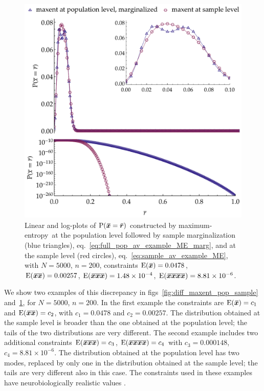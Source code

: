 \documentclass{article}
\theoremstyle{remark}
\theoremstyle{innote}
\newcommand*{\citep}{\parencites}
\renewcommand*{\cite}{\citep}
\renewcommand*{\|}{\mathpunct{|}}%
\newcommand*{\p}{\mathrm{P}}%
\newcommand*{\eqn}{eq.}%
\newcommand*{\figs}{figs}%
\newcommand*{\E}{\mathrm{E}}
\DeclarePairedDelimiter\expp{(}{)}
\newcommand*{\expe}{\E\expp}%
\theoremstyle{simple}
\newcommand*{\widebar}[1]{{\mkern1.5mu\skew{2}\overline{\mkern-1.5mu#1\mkern-1.5mu}\mkern 1.5mu}}
\newcommand*{\sav}{\widebar} %
\newcommand*{\yxx}{x}%
\newcommand*{\yx}{\bm{\yxx}}%
\newcommand*{\yxs}{\sav{\yx}}%
\newcommand*{\yxxs}{\sav{\yx\yx}}%
\newcommand*{\yr}{\bm{r}}%
\newcommand*{\yrs}{\sav{\yr}}%
\newcommand*{\me}{maximum-entropy}
\begin{document}
\begin{figure}[!t]
\centering
\includegraphics[width=0.99\linewidth]{different_maxent_pop_sample_200_realdata_4mom.pdf}
% 
\caption{Linear and log-plots of $\p(\yxs = \yrs)$ constructed by \me\ at
  the population level followed by sample marginalization (blue triangles),
  \eqn~\eqref{eq:full_pop_av_example_ME_marg}, and at the sample level (red
  circles), \eqn~\eqref{eq:sample_av_example_ME}, with $N=5000$,
  $n=200$, constraints $\expe{\yxs}=0.0478$, $\expe{\yxxs}=0.00257$,
  $\expe{\sav{\yx\yx\yx}}=1.48\times10^{-4}$,
  $\expe{\sav{\yx\yx\yx\yx}}=8.81\times 10^{-6}$.}
\label{fig:diff_maxent_pop_sample_realdata}
\end{figure}%
We show two examples of this discrepancy in
\figs~\ref{fig:diff_maxent_pop_sample}
and~\ref{fig:diff_maxent_pop_sample_realdata}, for $N=5000$, $n=200$. In
the first example the constraints are $\expe{\yxs} = c_1$ and
$\expe{\yxxs} = c_2$, with $c_1=0.0478$ and $c_2=0.00257$. The distribution
obtained at the sample level is broader than the one obtained at the
population level; the tails of the two distributions are very different.
The second example includes two additional constraints
$\expe{\sav{\yx\yx\yx}}= c_3$, $\expe{\sav{\yx\yx\yx\yx}}=c_4$ with
$c_3=0.000148$, $c_4=8.81\times 10^{-6}$. The distribution obtained at the
population level has two modes, replaced by only one in the distribution
obtained at the sample level; the tails are very different also in this
case. The constraints used in these examples have neurobiologically
realistic values \cite{rostamietal2016}.
\end{document}
